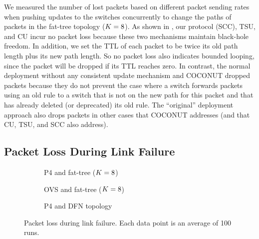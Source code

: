 We measured the number of lost packets based on different packet
sending rates when pushing updates to the switches concurrently to
change the paths of packets in the fat-tree topology
($K=8$).  As shown in , our
protocol (SCC), TSU, and CU incur no packet loss because these two
mechanisms maintain black-hole freedom.  In addition, we set the TTL
of each packet to be twice its old path length plus its new path
length. So no packet loss also indicates bounded looping, since the
packet will be dropped if its TTL reaches zero.  In contrast, the
normal deployment without any consistent update mechanism and COCONUT
dropped packets because they do not prevent the case where a switch
forwards packets using an old rule to a switch that is not on the new
path for this packet and that has already deleted (or deprecated) its
old rule.  The ``original'' deployment approach also drops packets in
other cases that COCONUT addresses (and that CU, TSU, and SCC also
address).


\subsection{Packet Loss During Link Failure}
\label{sec:eval:link-failure}

\begin{figure}[h]
\centering
  \begin{subfigure}[b]{0.49\linewidth}
    \resizebox{\linewidth}{!}{}
    \caption{P4 and fat-tree ($K=8$)}
    \label{fig:link_failure:fat_tree-p4}
  \end{subfigure}
    \begin{subfigure}[b]{0.49\linewidth}
    \resizebox{\linewidth}{!}{}
    \caption{OVS and fat-tree ($K=8$)}
    \label{fig:link_failure:fat_tree-ovs}
  \end{subfigure}
    \begin{subfigure}[b]{0.49\linewidth}
    \resizebox{\linewidth}{!}{}
    \caption{P4 and DFN topology}
    \label{fig:link_failure:dfn}
  \end{subfigure}
  \caption{Packet loss during link failure.  Each data point is an
  average of 100 runs.}
  \label{fig:link_failure}
\end{figure}


